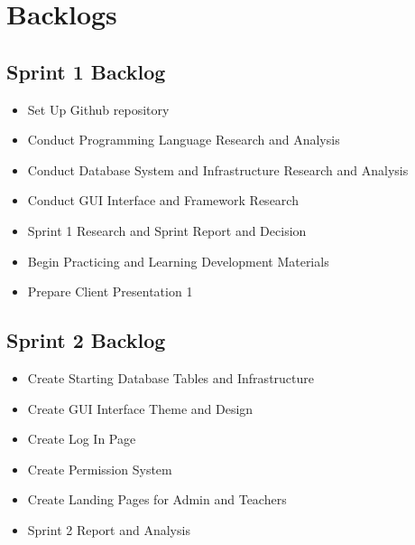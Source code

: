 
\section{Backlogs}
\subsection{Sprint 1 Backlog}
\begin{itemize}
\item Set Up Github repository
\item Conduct Programming Language Research and Analysis
\item Conduct Database System and Infrastructure Research and Analysis
\item Conduct GUI Interface and Framework Research 
\item Sprint 1 Research and Sprint Report and Decision
\item Begin Practicing and Learning Development Materials
\item Prepare Client Presentation 1
\end{itemize}

\subsection{Sprint 2 Backlog}
\begin{itemize}
\item Create Starting Database Tables and Infrastructure
\item Create GUI Interface Theme and Design
\item Create Log In Page 
\item Create Permission System 
\item Create Landing Pages for Admin and Teachers
\item Sprint 2 Report and Analysis  
\end{itemize}

